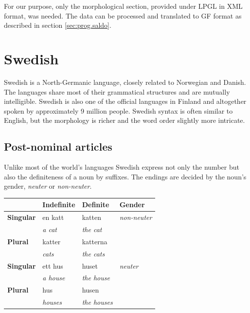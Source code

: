 \documentclass{report}
\begin{document}
For our purpose, only the morphological section, provided under LPGL in XML
format, was needed.
The data can be processed and translated to GF format as described in 
section \ref{sec:prog.saldo}.

\section{Swedish}
\label{sec:swedish}
Swedish \cite[Inl. ]{SAG}is a North-Germanic language,
closely related to Norwegian and Danish. The languages share most of their
grammatical structures and are mutually intelligible. Swedish is also 
one of the official languages in Finland and altogether spoken by approximately 9
million people.
Swedish syntax is often similar to English, but the  morphology is richer and the
word order slightly more intricate.

\subsection*{Post-nominal articles} 
\label{sec:swedishnoun}
Unlike most of the world's languages Swedish express not only the number but also
the definiteness of a noun by suffixes. The endings are decided by the noun's gender,
\textit{neuter} or \textit{non-neuter}.\\
\begin{tabular}{l|lll}
                  &\textbf{Indefinite} & \textbf{Definite}& \textbf{Gender} \\
 \hline
\textbf{Singular} & {en katt}        & {katten}           & \textit{non-neuter}\\
                  & \emph{a cat}     & \emph{the cat}     &\\
\textbf{Plural}   & katter           & katterna           &\\
                  &\emph{cats}       & \emph{the cats}    &\\
 \hline
\textbf{Singular} & {ett hus}        & {huset}            & \textit{neuter}\\
                  & \emph{a house}   & \emph{the house}   & \\
\textbf{Plural}   & hus              & husen              & \\
                  & \emph{houses}    & \emph{the houses}  & \\
\end{tabular}\\
\end{document}
